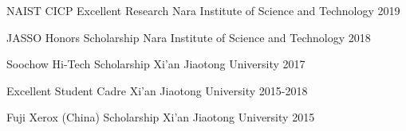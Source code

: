 




\begin{cvhonors}




  \cvhonor
    {NAIST CICP Excellent Research} %
    {Nara Institute of Science and Technology} 
    {}%
    {2019} %
    
  \cvhonor
    {JASSO Honors Scholarship} %
    {Nara Institute of Science and Technology} 
    {}%
    {2018} %
    
  \cvhonor
    {Soochow Hi-Tech Scholarship} %
    {Xi'an Jiaotong University} 
    {}%
    {2017} %
    
  \cvhonor
    {Excellent Student Cadre} %
    {Xi'an Jiaotong University} 
    {}%
    {2015-2018} %
    
  \cvhonor
    {Fuji Xerox (China) Scholarship} %
    {Xi'an Jiaotong University} 
    {}%
    {2015} %
\end{cvhonors}





